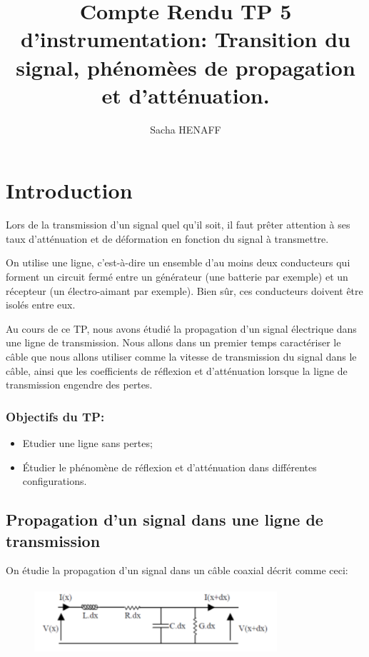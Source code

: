 \documentclass[12pt,a4paper, french]{article}
\title{Compte Rendu TP 5 d'instrumentation: Transition du signal, phénomèes de propagation et d'atténuation.}
\author{Sacha HENAFF}
\date{}
\begin{document}
    \maketitle
    \tableofcontents
    \section*{Introduction}
    Lors de la transmission d'un signal quel qu'il soit, il faut prêter attention à ses taux d'atténuation
     et de déformation en fonction du signal à transmettre. 
    
     On utilise une ligne, c'est-à-dire un ensemble d'au moins deux conducteurs qui forment un circuit
     fermé entre un générateur (une batterie par exemple) et un récepteur (un électro-aimant par exemple). Bien sûr, 
     ces conducteurs doivent être isolés entre eux.
    
    Au cours de ce TP, nous avons étudié la propagation d'un signal électrique dans une ligne de 
    transmission. Nous allons dans un premier temps caractériser le câble que nous allons utiliser comme la vitesse 
    de transmission du signal dans le câble, ainsi que les coefficients de réflexion et d'atténuation lorsque la ligne 
    de transmission engendre des pertes. 
    
    \subsubsection*{Objectifs du TP:}
    \begin{itemize}
        \item Etudier une ligne sans pertes;
        \item Étudier le phénomène de réflexion et d'atténuation dans différentes configurations.
        \end{itemize}
    
    
    \begin{center}
    \section{Propagation d'un signal dans une ligne de transmission}
    \end{center}
    
    On étudie la propagation d’un signal dans un câble coaxial décrit comme ceci:
    \begin{figure}[!h]
    \begin{center}
        \includegraphics[width=9cm,height=2.5cm]{cablecoax.png}
    \end{center}
    \end{figure}
    
\end{document}
